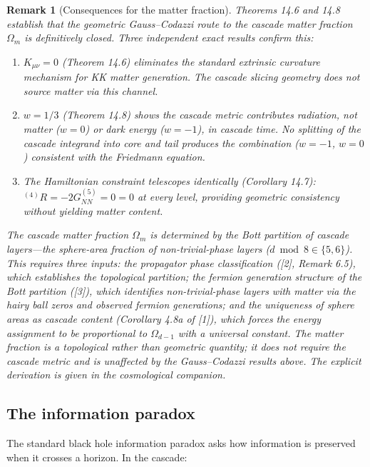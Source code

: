 \documentclass[12pt,a4paper]{article}
\newtheorem*{remark}{Remark}
\begin{document}
\begin{remark}[Consequences for the matter fraction]
Theorems 14.6 and 14.8 establish
that the geometric Gauss--Codazzi route to the cascade matter fraction $\Omega_m$ is definitively
closed. Three independent exact results confirm this:
\begin{enumerate}
\item $K_{\mu\nu} = 0$ (Theorem 14.6) eliminates the standard extrinsic curvature mechanism for
KK matter generation. The cascade slicing geometry does not source matter via this
channel.
\item $w = 1/3$ (Theorem 14.8) shows the cascade metric contributes radiation, not matter
($w = 0$) or dark energy ($w = -1$), in cascade time. No splitting of the cascade
integrand into core and tail produces the combination ($w = -1$, $w = 0$) consistent
with the Friedmann equation.
\item The Hamiltonian constraint telescopes identically (Corollary 14.7): ${}^{(4)}R = -2G^{(5)}_{NN} =
0 = 0$ at every level, providing geometric consistency without yielding matter content.
\end{enumerate}
The cascade matter fraction $\Omega_m$ is determined by the Bott partition of cascade layers---the sphere-area fraction of non-trivial-phase layers ($d \bmod 8 \in \{5, 6\}$). This requires
three inputs: the propagator phase classification ([2], Remark 6.5), which establishes the
topological partition; the fermion generation structure of the Bott partition ([3]), which
identifies non-trivial-phase layers with matter via the hairy ball zeros and observed fermion
generations; and the uniqueness of sphere areas as cascade content (Corollary 4.8a of [1]),
which forces the energy assignment to be proportional to $\Omega_{d-1}$ with a universal constant.
The matter fraction is a topological rather than geometric quantity; it does not require
the cascade metric and is unaffected by the Gauss--Codazzi results above. The explicit
derivation is given in the cosmological companion.
\end{remark}

\subsection{The information paradox}

The standard black hole information paradox asks how information is preserved when it
crosses a horizon. In the cascade:
\end{document}

